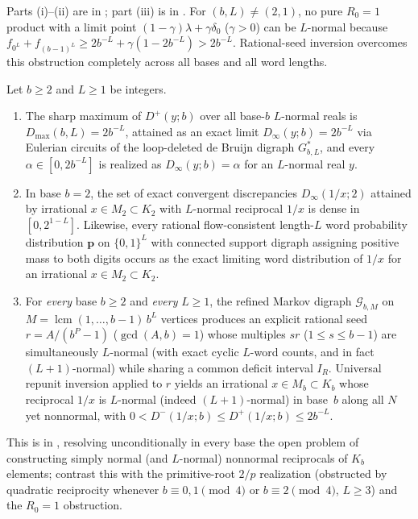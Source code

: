 \documentclass[11pt]{article}
\DeclareMathOperator{\lcm}{lcm}
\begin{document}
Parts (i)--(ii) are  in ; part (iii) is  in . For $(b,L)\neq(2,1)$, no pure $R_0=1$ product with a limit point $(1-\gamma)\lambda+\gamma\delta_0$ ($\gamma>0$) can be $L$-normal because $f_{0^L}+f_{(b-1)^L}\ge 2b^{-L}+\gamma(1-2b^{-L})>2b^{-L}$. Rational-seed inversion overcomes this obstruction completely across all bases and all word lengths.

\begin{maintheorem}\label{thm:D}
Let $b\ge2$ and $L\ge1$ be integers.
\begin{enumerate}[label=\textup{(\roman*)},nosep]
\item {} The sharp maximum of $D^+(y;b)$ over all base-$b$ $L$-normal reals is $D_{\max}(b,L)=2b^{-L}$, attained as an exact limit $D_\infty(y;b)=2b^{-L}$ via Eulerian circuits of the loop-deleted de Bruijn digraph $G_{b,L}^*$, and every $\alpha\in[0,2b^{-L}]$ is realized as $D_\infty(y;b)=\alpha$ for an $L$-normal real $y$.
\item {} In base $b=2$, the set of exact convergent discrepancies $D_\infty(1/x;2)$ attained by irrational $x\in M_2\subset K_2$ with $L$-normal reciprocal $1/x$ is dense in $[0,2^{1-L}]$. Likewise, every rational flow-consistent length-$L$ word probability distribution $\mathbf p$ on $\{0,1\}^L$ with connected support digraph assigning positive mass to both digits occurs as the exact limiting word distribution of $1/x$ for an irrational $x\in M_2\subset K_2$.
\item {} For \emph{every} base $b\ge2$ and \emph{every} $L\ge1$, the refined Markov digraph $\mathcal G_{b,M}$ on $M=\lcm(1,\dots,b-1)\,b^L$ vertices produces an explicit rational seed $r=A/(b^P-1)$ ($\gcd(A,b)=1$) whose multiples $sr$ ($1\le s\le b-1$) are simultaneously $L$-normal (with exact cyclic $L$-word counts, and in fact $(L+1)$-normal) while sharing a common deficit interval $I_R$. Universal repunit inversion applied to $r$ yields an irrational $x\in M_b\subset K_b$ whose reciprocal $1/x$ is $L$-normal (indeed $(L+1)$-normal) in base~$b$ along all $N$ yet nonnormal, with $0<D^-(1/x;b)\le D^+(1/x;b)\le 2b^{-L}$.
\end{enumerate}
\end{maintheorem}

This is  in , resolving unconditionally in every base the open problem of constructing simply normal (and $L$-normal) nonnormal reciprocals of $K_b$ elements;  contrast this with the primitive-root $2/p$ realization (obstructed by quadratic reciprocity whenever $b\equiv0,1\pmod4$ or $b\equiv2\pmod4$, $L\ge3$) and the $R_0=1$ obstruction.
\end{document}
